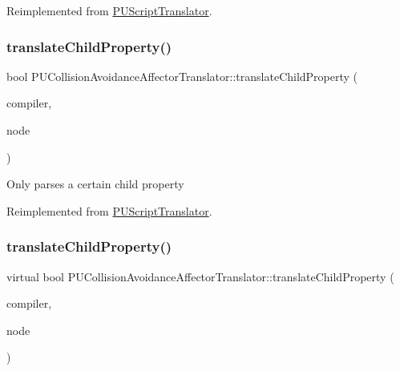 Reimplemented from \hyperlink{classPUScriptTranslator_ab587d01348ae3e678cb700c719b2b113}{P\+U\+Script\+Translator}.

\mbox{\label{classPUCollisionAvoidanceAffectorTranslator_aae7baf00fbd5f5ae31c3f7cd86759545}} 
\subsubsection{\texorpdfstring{translate\+Child\+Property()}{translateChildProperty()}\hspace{0.1cm}{\footnotesize\ttfamily [1/2]}}
{\footnotesize\ttfamily bool P\+U\+Collision\+Avoidance\+Affector\+Translator\+::translate\+Child\+Property (\begin{DoxyParamCaption}\item[{\hyperlink{classPUScriptCompiler}{P\+U\+Script\+Compiler} $\ast$}]{compiler,  }\item[{\hyperlink{classPUAbstractNode}{P\+U\+Abstract\+Node} $\ast$}]{node }\end{DoxyParamCaption})\hspace{0.3cm}{\ttfamily [virtual]}}

Only parses a certain child property 

Reimplemented from \hyperlink{classPUScriptTranslator_a0374d83a8a04e57918975d525e0f8fe8}{P\+U\+Script\+Translator}.

\mbox{\label{classPUCollisionAvoidanceAffectorTranslator_a93f7dba0bbf955e900af4179cb2af8f4}} 
\subsubsection{\texorpdfstring{translate\+Child\+Property()}{translateChildProperty()}\hspace{0.1cm}{\footnotesize\ttfamily [2/2]}}
{\footnotesize\ttfamily virtual bool P\+U\+Collision\+Avoidance\+Affector\+Translator\+::translate\+Child\+Property (\begin{DoxyParamCaption}\item[{\hyperlink{classPUScriptCompiler}{P\+U\+Script\+Compiler} $\ast$}]{compiler,  }\item[{\hyperlink{classPUAbstractNode}{P\+U\+Abstract\+Node} $\ast$}]{node }\end{DoxyParamCaption})\hspace{0.3cm}{\ttfamily [virtual]}}

